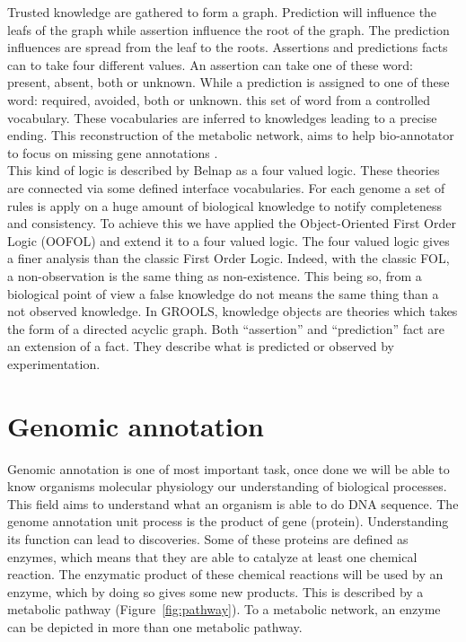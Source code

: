 \documentclass{llncs}
\begin{document}
Trusted knowledge are gathered to form a graph. Prediction will influence the leafs of the graph while assertion influence the root of the graph. The prediction influences are spread from the leaf to the roots. Assertions and predictions facts can to take four different values. An assertion can take one of these word:  present, absent, both or unknown. While a prediction is assigned to one of these word: required, avoided, both or unknown. this set of word from a controlled vocabulary. These vocabularies are inferred to knowledges leading to a precise ending. This reconstruction of the metabolic network, aims to help bio-annotator to focus on missing gene annotations  \cite{francke2005reconstructing}.\\
This kind of logic is described by Belnap \cite{belnap1977useful} as a four valued logic. These theories are connected via some defined interface vocabularies. For each genome a set of rules is apply on a huge amount of biological knowledge to notify completeness and consistency. To achieve this we have applied the Object-Oriented First Order Logic (OOFOL) \cite{amir1999object} and extend it to a four valued logic. The four valued logic gives a finer analysis than the classic First Order Logic. Indeed, with the classic FOL, a non-observation is the same thing as non-existence.  This being so, from a biological point of view a false knowledge do not means the same thing than a not observed knowledge. In GROOLS, knowledge objects are theories which takes the form of a directed acyclic graph. Both ``assertion'' and ``prediction'' fact are an extension of a fact. They describe what is predicted or observed by experimentation.

\section{Genomic annotation}

Genomic annotation is one of most important task, once done we will be able to know organisms molecular physiology  our understanding of biological processes. This field aims to understand what an organism is able to do  DNA sequence. The genome annotation unit process is the product of gene (protein). Understanding its function can lead to  discoveries. Some of these proteins are defined as enzymes, which means that they are able to catalyze at least one chemical reaction. The enzymatic product of these chemical reactions will be used by an enzyme, which by doing so gives some new products. This  is described by a metabolic pathway (Figure~\ref{fig:pathway}). To  a metabolic network, an enzyme can be depicted in more than one metabolic pathway.
\end{document}
